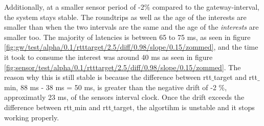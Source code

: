 Additionally, at a smaller sensor period of -2$\%$ compared to the gateway-interval, the system stays stable. The roundtrips as well as the age of the interests are smaller than when the two intervals are the same and the age of the \textit{interests} are smaller too. The majority of latencies is between 65 to 75 ms, as seen in figure \ref{fig:gw/test/alpha/0.1/rtttarget/2.5/diff/0.98/slope/0.15/zommed}, and the time it took to consume the interest was around 40 ms as seen in figure \ref{fig:sensor/test/alpha/0.1/rtttarget/2.5/diff/0.98/slope/0.15/zommed}. The reason why this is still stable is because the difference between rtt$\_$target and rtt$\_$min, 88 ms - 38 ms = 50 ms, is greater than the negative drift of -2 $\%$, approximatly 23 ms, of the sensors interval clock. Once the drift exceeds the difference between rtt$\_$min and rtt$\_$target, the algortihm is unstable and it stops working properly.




